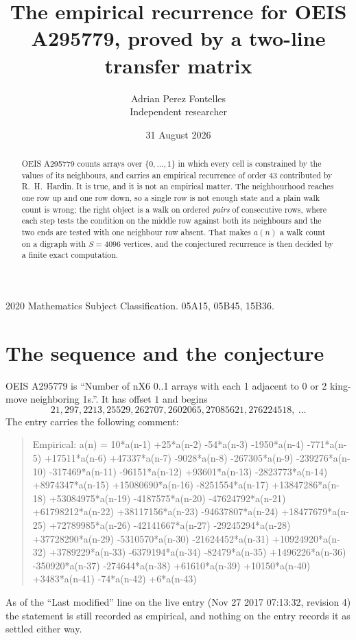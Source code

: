 \documentclass[11pt,a4paper]{article}
\title{The empirical recurrence for OEIS A295779, proved by a two-line transfer matrix}
\author{Adrian Perez Fontelles\\ \small Independent researcher}
\date{31 August 2026}
\theoremstyle{plain}
\theoremstyle{definition}
\begin{document}
\maketitle

\begin{abstract}
OEIS A295779 counts arrays over $\{0,\dots,1\}$ in which every cell is constrained by the
values of its neighbours, and carries an empirical recurrence of order $43$ contributed
by R.~H.~Hardin. It is true, and it is not an empirical matter. The neighbourhood reaches one
row up and one row down, so a single row is not enough state and a plain walk count
is wrong; the right object is a walk on ordered \emph{pairs} of consecutive rows, where
each step tests the condition on the middle row against both its neighbours and the two
ends are tested with one neighbour row absent. That makes $a(n)$ a walk count on a digraph
with $S=4096$ vertices, and the conjectured recurrence is then decided by a finite exact
computation.
\end{abstract}

\noindent\small 2020 Mathematics Subject Classification. 05A15, 05B45, 15B36.\normalsize

\section{The sequence and the conjecture}

OEIS A295779 is ``Number of nX6 0..1 arrays with each 1 adjacent to 0 or 2 king-move neighboring 1s.''. It has offset $1$ and begins
\[
21, 297, 2213, 25529, 262707, 2602065, 27085621, 276224518,\ \dots
\]
The entry carries the following comment:
\begin{quote}\small
Empirical: a(n) = 10*a(n-1) +25*a(n-2) -54*a(n-3) -1950*a(n-4) -771*a(n-5) +17511*a(n-6) +47337*a(n-7) -9028*a(n-8) -267305*a(n-9) -239276*a(n-10) -317469*a(n-11) -96151*a(n-12) +93601*a(n-13) -2823773*a(n-14) +8974347*a(n-15) +15080690*a(n-16) -8251554*a(n-17) +13847286*a(n-18) +53084975*a(n-19) -4187575*a(n-20) -47624792*a(n-21) +61798212*a(n-22) +38117156*a(n-23) -94637807*a(n-24) +18477679*a(n-25) +72789985*a(n-26) -42141667*a(n-27) -29245294*a(n-28) +37728290*a(n-29) -5310570*a(n-30) -21624452*a(n-31) +10924920*a(n-32) +3789229*a(n-33) -6379194*a(n-34) -82479*a(n-35) +1496226*a(n-36) -350920*a(n-37) -274644*a(n-38) +61610*a(n-39) +10150*a(n-40) +3483*a(n-41) -74*a(n-42) +6*a(n-43)
\end{quote}
As of the ``Last modified'' line on the live entry (Nov 27 2017 07:13:32, revision 4) the statement is
still recorded as empirical, and nothing on the entry records it as settled either way.
\end{document}
